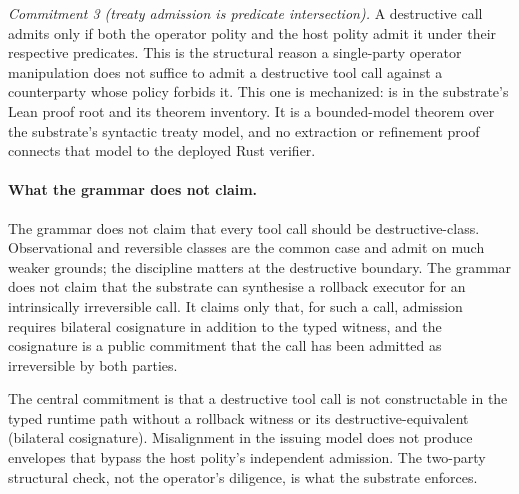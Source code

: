 \emph{Commitment 3 (treaty admission is predicate intersection).} A destructive call admits only if both the operator polity and the host polity admit it under their respective predicates. This is the structural reason a single-party operator manipulation does not suffice to admit a destructive tool call against a counterparty whose policy forbids it. This one is mechanized:  is in the substrate's Lean proof root and its theorem inventory. It is a bounded-model theorem over the substrate's syntactic treaty model, and no extraction or refinement proof connects that model to the deployed Rust verifier.

\paragraph{What the grammar does not claim.}
The grammar does not claim that every tool call should be destructive-class. Observational and reversible classes are the common case and admit on much weaker grounds; the discipline matters at the destructive boundary. The grammar does not claim that the substrate can synthesise a rollback executor for an intrinsically irreversible call. It claims only that, for such a call, admission requires bilateral cosignature in addition to the typed witness, and the cosignature is a public commitment that the call has been admitted as irreversible by both parties.

The central commitment is that a destructive tool call is not constructable in the typed runtime path without a rollback witness or its destructive-equivalent (bilateral cosignature). Misalignment in the issuing model does not produce envelopes that bypass the host polity's independent admission. The two-party structural check, not the operator's diligence, is what the substrate enforces.
